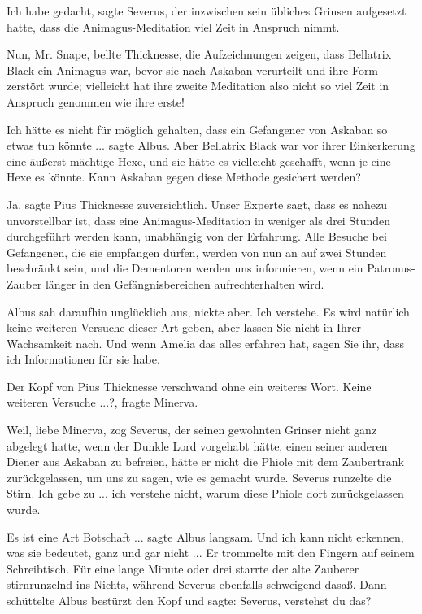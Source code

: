 \glqq{}Ich habe gedacht\grqq{}, sagte Severus, der inzwischen sein übliches
Grinsen aufgesetzt hatte, \glqq{}dass die Animagus-Meditation viel Zeit in
Anspruch nimmt.\grqq{}

\glqq{}Nun, Mr. Snape\grqq{}, bellte Thicknesse, \glqq{}die Aufzeichnungen zeigen,
dass Bellatrix Black ein Animagus war, bevor sie nach Askaban verurteilt und
ihre Form zerstört wurde; vielleicht hat ihre zweite Meditation also nicht so
viel Zeit in Anspruch genommen wie ihre erste!\grqq{}

\glqq{}Ich hätte es nicht für möglich gehalten, dass ein Gefangener von Askaban
so etwas tun könnte ...\grqq{} sagte Albus. \glqq{}Aber Bellatrix Black war vor
ihrer Einkerkerung eine äußerst mächtige Hexe, und sie hätte es vielleicht
geschafft, wenn je eine Hexe es könnte. Kann Askaban gegen diese Methode
gesichert werden?\grqq{}

\glqq{}Ja\grqq{}, sagte Pius Thicknesse zuversichtlich. \glqq{}Unser Experte sagt,
dass es nahezu unvorstellbar ist, dass eine Animagus-Meditation in weniger als
drei Stunden durchgeführt werden kann, unabhängig von der Erfahrung. Alle
Besuche bei Gefangenen, die sie empfangen dürfen, werden von nun an auf zwei
Stunden beschränkt sein, und die Dementoren werden uns informieren, wenn ein
Patronus-Zauber länger in den Gefängnisbereichen aufrechterhalten wird.\grqq{}

Albus sah daraufhin unglücklich aus, nickte aber. \glqq{}Ich verstehe. Es wird
natürlich keine weiteren Versuche dieser Art geben, aber lassen Sie nicht in
Ihrer Wachsamkeit nach. Und wenn Amelia das alles erfahren hat, sagen Sie ihr,
dass ich Informationen für sie habe.\grqq{}

Der Kopf von Pius Thicknesse verschwand ohne ein weiteres Wort. \glqq{}Keine
weiteren Versuche ...?\grqq{}, fragte Minerva.

\glqq{}Weil, liebe Minerva\grqq{}, zog Severus, der seinen gewohnten Grinser
nicht ganz abgelegt hatte, \glqq{}wenn der Dunkle Lord vorgehabt hätte, einen
seiner anderen Diener aus Askaban zu befreien, hätte er nicht die Phiole mit dem
Zaubertrank zurückgelassen, um uns zu sagen, wie es gemacht wurde.\grqq{}
Severus runzelte die Stirn. \glqq{}Ich gebe zu ... ich verstehe nicht, warum
diese Phiole dort zurückgelassen wurde.\grqq{}

\glqq{}Es ist eine Art Botschaft ...\grqq{} sagte Albus langsam. \glqq{}Und ich
kann nicht erkennen, was sie bedeutet, ganz und gar nicht ...\grqq{} Er
trommelte mit den Fingern auf seinem Schreibtisch. Für eine lange Minute oder
drei starrte der alte Zauberer stirnrunzelnd ins Nichts, während Severus
ebenfalls schweigend dasaß. Dann schüttelte Albus bestürzt den Kopf und sagte:
\glqq{}Severus, verstehst du das?\grqq{}

